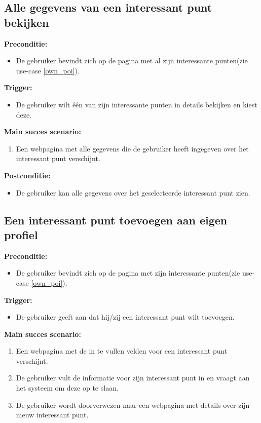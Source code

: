 \documentclass[11pt,twoside,a4paper]{article}
\newcommand{\subpunt}[1]{
	\noindent
	\textbf{\small{#1}}
}
\newenvironment{precond}{
	\subpunt{Preconditie:}
	\begin{itemize}[label={}]
}{
	\end{itemize}
}
\newenvironment{trigger}{
	\subpunt{Trigger:}
	\begin{itemize}[label={}]
}{
	\end{itemize}
}
\newenvironment{mainss}{
	\subpunt{Main succes scenario:}
	\begin{enumerate}
}{
	\end{enumerate}
}
\newenvironment{postcond}{
	\subpunt{Postconditie:}
	\begin{itemize}[label={}]
}{
	\end{itemize}
}
\begin{document}
	
	\subsection{Alle gegevens van een interessant punt bekijken}\label{poi_detail}
	
	\begin{precond}
		\item De gebruiker bevindt zich op de pagina met al zijn interessante punten(zie use-case \ref{own_poi}).
	\end{precond}
	
	\begin{trigger}
		\item De gebruiker wilt \'e\'en van zijn interessante punten in details bekijken en kiest deze.
	\end{trigger}
	
	\begin{mainss}
		\item Een webpagina met alle gegevens die de gebruiker heeft ingegeven over het interessant punt verschijnt.
	\end{mainss}
	
	\begin{postcond}
		\item De gebruiker kan alle gegevens over het geselecteerde interessant punt zien.
	\end{postcond}
	
	
	\subsection{Een interessant punt toevoegen aan eigen profiel}
	
	\begin{precond}
		\item De gebruiker bevindt zich op de pagina met zijn interessante punten(zie use-case \ref{own_poi}).
	\end{precond}
	
	\begin{trigger}
		\item De gebruiker geeft aan dat hij/zij een interessant punt wilt toevoegen.
	\end{trigger}
	
	\begin{mainss}
		\item Een webpagina met de in te vullen velden voor een interessant punt verschijnt.
		\item De gebruiker vult de informatie voor zijn interessant punt in en vraagt aan het systeem om deze op te slaan.\label{newpoi_inv}
		\item De gebruiker wordt doorverwezen naar een webpagina met details over zijn nieuw interessant punt.\label{newpoi_end}
	\end{mainss}	
	
\end{document}
